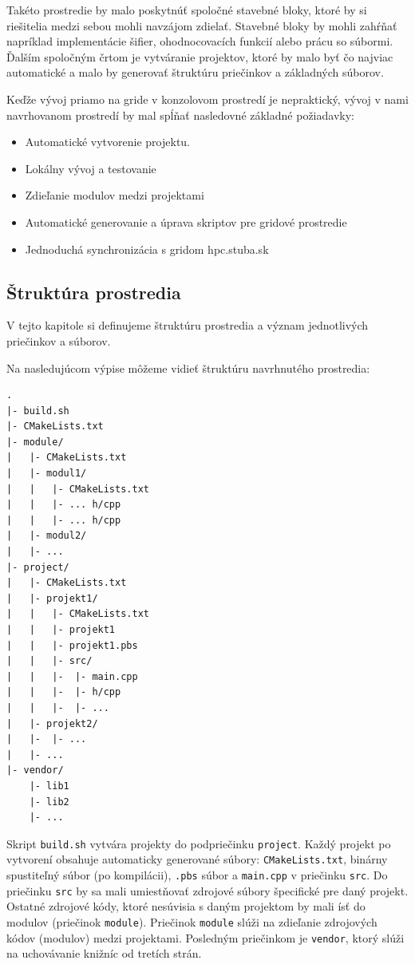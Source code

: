 Takéto prostredie by malo poskytnúť spoločné stavebné bloky, ktoré by si riešitelia medzi sebou mohli navzájom zdielať.
Stavebné bloky by mohli zahŕňať napríklad implementácie šifier, ohodnocovacích funkcií alebo prácu so súbormi.
Ďalším spoločným črtom je vytváranie projektov, ktoré by malo byť čo najviac automatické a malo by generovať štruktúru priečinkov a základných súborov.

Keďže vývoj priamo na gride v konzolovom prostredí je nepraktický, vývoj v nami navrhovanom prostredí by mal spĺňať nasledovné
základné požiadavky:
\begin{itemize}
\item
  Automatické vytvorenie projektu.
\item
  Lokálny vývoj a testovanie
\item
  Zdieľanie modulov medzi projektami
\item
  Automatické generovanie a úprava skriptov pre gridové prostredie
\item
  Jednoduchá synchronizácia s gridom hpc.stuba.sk
\end{itemize}

\subsection{Štruktúra prostredia}
V tejto kapitole si definujeme štruktúru prostredia a význam jednotlivých priečinkov a súborov.

Na nasledujúcom výpise môžeme vidieť štruktúru navrhnutého prostredia:
\begin{lstlisting}[caption={Štruktúra prostredia}, label={prop:struktura}]
.
|- build.sh
|- CMakeLists.txt
|- module/
|   |- CMakeLists.txt
|   |- modul1/
|   |   |- CMakeLists.txt
|   |   |- ... h/cpp
|   |   |- ... h/cpp
|   |- modul2/
|   |- ...
|- project/
|   |- CMakeLists.txt
|   |- projekt1/
|   |   |- CMakeLists.txt
|   |   |- projekt1
|   |   |- projekt1.pbs
|   |   |- src/
|   |   |-  |- main.cpp
|   |   |-  |- h/cpp
|   |   |-  |- ...
|   |- projekt2/
|   |-  |- ...
|   |- ...
|- vendor/
    |- lib1
    |- lib2
    |- ...
\end{lstlisting}
  
Skript \texttt{build.sh} vytvára projekty do podpriečinku \texttt{project}. Každý projekt po vytvorení obsahuje automaticky generované súbory:
\texttt{CMakeLists.txt}, binárny spustiteľný súbor (po kompilácii), \texttt{.pbs} súbor a \texttt{main.cpp} v priečinku \texttt{src}.
Do priečinku \texttt{src} by sa mali umiestňovať zdrojové súbory špecifické pre daný projekt.
Ostatné zdrojové kódy, ktoré nesúvisia s daným projektom by mali ísť do modulov (priečinok \texttt{module}).
Priečinok \texttt{module} slúži na zdieľanie zdrojových kódov (modulov) medzi projektami.
Posledným priečinkom je \texttt{vendor}, ktorý slúži na uchovávanie knižníc od tretích strán.
